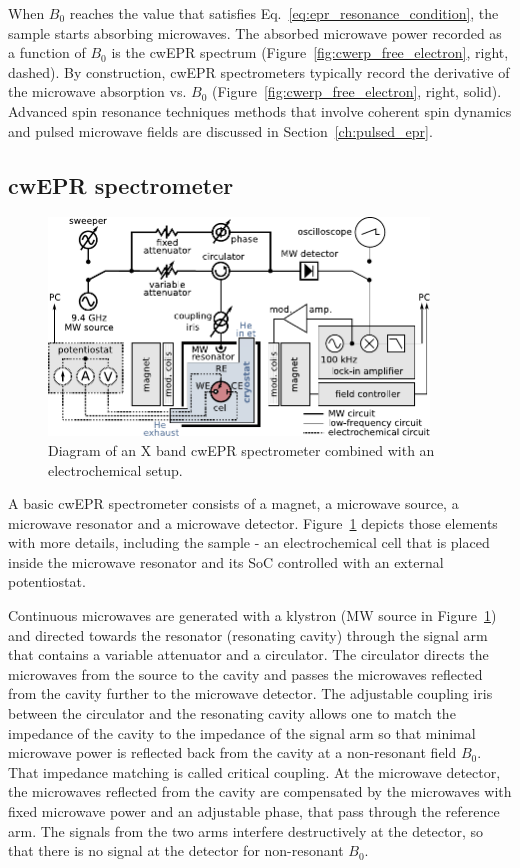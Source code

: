 \par
When $B_0$ reaches the value that satisfies Eq.~\ref{eq:epr_resonance_condition}, the sample starts absorbing microwaves. The absorbed microwave power recorded as a function of $B_0$ is the cwEPR spectrum (Figure~\ref{fig:cwerp_free_electron}, right, dashed). By construction, cwEPR spectrometers typically record the derivative of the microwave absorption vs. $B_0$ (Figure~\ref{fig:cwerp_free_electron}, right, solid). Advanced spin resonance techniques methods that involve coherent spin dynamics and pulsed microwave fields are discussed in Section~\ref{ch:pulsed_epr}.

\subsection{cwEPR spectrometer}
\begin{figure}[h]
\center
	\includegraphics[width=0.9\textwidth]{./operando_epr/figures/cwEPR_spectrometer_diagram.pdf}
	\caption{Diagram of an X band cwEPR spectrometer combined with an electrochemical setup.}
	\label{fig:cwerp_spectrometer}
\end{figure}

A basic cwEPR spectrometer consists of a magnet, a microwave source, a microwave resonator and a microwave detector. Figure~\ref{fig:cwerp_spectrometer} depicts those elements with more details, including the sample - an electrochemical cell that is placed inside the microwave resonator and its SoC controlled with an external potentiostat.

\par
Continuous microwaves are generated with a klystron (MW source in Figure~\ref{fig:cwerp_spectrometer}) and directed towards the resonator (resonating cavity) through the signal arm that contains a variable attenuator and a circulator. The circulator directs the microwaves from the source to the cavity and passes the microwaves reflected from the cavity further to the microwave detector. The adjustable coupling iris between the circulator and the resonating cavity allows one to match the impedance of the cavity to the impedance of the signal arm so that minimal microwave power is reflected back from the cavity at a non-resonant field $B_0$. That impedance matching is called critical coupling. At the microwave detector, the microwaves reflected from the cavity are compensated by the microwaves with fixed microwave power and an adjustable phase, that pass through the reference arm. The signals from the two arms interfere destructively at the detector, so that there is no signal at the detector for non-resonant $B_0$.

